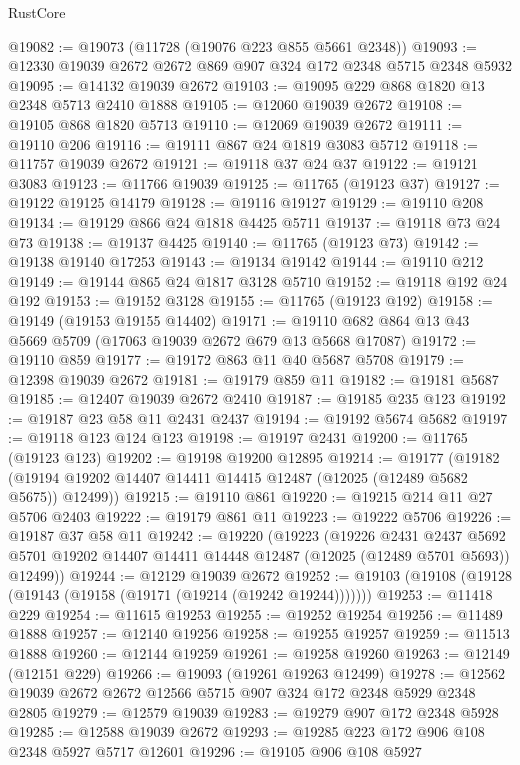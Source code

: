 \begin{lexlean}{RustCore}
\begin{coremodule}
@19082 := @19073 (@11728 (@19076 @223 @855 @5661 @2348))
@19093 := @12330 @19039 @2672 @2672 @869 @907 @324 @172 @2348 @5715 @2348 @5932
@19095 := @14132 @19039 @2672
@19103 := @19095 @229 @868 @1820 @13 @2348 @5713 @2410 @1888
@19105 := @12060 @19039 @2672
@19108 := @19105 @868 @1820 @5713
@19110 := @12069 @19039 @2672
@19111 := @19110 @206
@19116 := @19111 @867 @24 @1819 @3083 @5712
@19118 := @11757 @19039 @2672
@19121 := @19118 @37 @24 @37
@19122 := @19121 @3083
@19123 := @11766 @19039
@19125 := @11765 (@19123 @37)
@19127 := @19122 @19125 @14179
@19128 := @19116 @19127
@19129 := @19110 @208
@19134 := @19129 @866 @24 @1818 @4425 @5711
@19137 := @19118 @73 @24 @73
@19138 := @19137 @4425
@19140 := @11765 (@19123 @73)
@19142 := @19138 @19140 @17253
@19143 := @19134 @19142
@19144 := @19110 @212
@19149 := @19144 @865 @24 @1817 @3128 @5710
@19152 := @19118 @192 @24 @192
@19153 := @19152 @3128
@19155 := @11765 (@19123 @192)
@19158 := @19149 (@19153 @19155 @14402)
@19171 := @19110 @682 @864 @13 @43 @5669 @5709 (@17063 @19039 @2672 @679 @13 @5668 @17087)
@19172 := @19110 @859
@19177 := @19172 @863 @11 @40 @5687 @5708
@19179 := @12398 @19039 @2672
@19181 := @19179 @859 @11
@19182 := @19181 @5687
@19185 := @12407 @19039 @2672 @2410
@19187 := @19185 @235 @123
@19192 := @19187 @23 @58 @11 @2431 @2437
@19194 := @19192 @5674 @5682
@19197 := @19118 @123 @124 @123
@19198 := @19197 @2431
@19200 := @11765 (@19123 @123)
@19202 := @19198 @19200 @12895
@19214 := @19177
    (@19182 (@19194 @19202 @14407 @14411 @14415 @12487 (@12025 (@12489 @5682 @5675)) @12499))
@19215 := @19110 @861
@19220 := @19215 @214 @11 @27 @5706 @2403
@19222 := @19179 @861 @11
@19223 := @19222 @5706
@19226 := @19187 @37 @58 @11
@19242 := @19220
    (@19223
      (@19226
        @2431
        @2437
        @5692
        @5701
        @19202
        @14407
        @14411
        @14448
        @12487
        (@12025 (@12489 @5701 @5693))
        @12499))
@19244 := @12129 @19039 @2672
@19252 := @19103 (@19108 (@19128 (@19143 (@19158 (@19171 (@19214 (@19242 @19244)))))))
@19253 := @11418 @229
@19254 := @11615 @19253
@19255 := @19252 @19254
@19256 := @11489 @1888
@19257 := @12140 @19256
@19258 := @19255 @19257
@19259 := @11513 @1888
@19260 := @12144 @19259
@19261 := @19258 @19260
@19263 := @12149 (@12151 @229)
@19266 := @19093 (@19261 @19263 @12499)
@19278 := @12562 @19039 @2672 @2672 @12566 @5715 @907 @324 @172 @2348 @5929 @2348 @2805
@19279 := @12579 @19039
@19283 := @19279 @907 @172 @2348 @5928
@19285 := @12588 @19039 @2672
@19293 := @19285 @223 @172 @906 @108 @2348 @5927 @5717 @12601
@19296 := @19105 @906 @108 @5927

\end{coremodule}
\end{lexlean}
